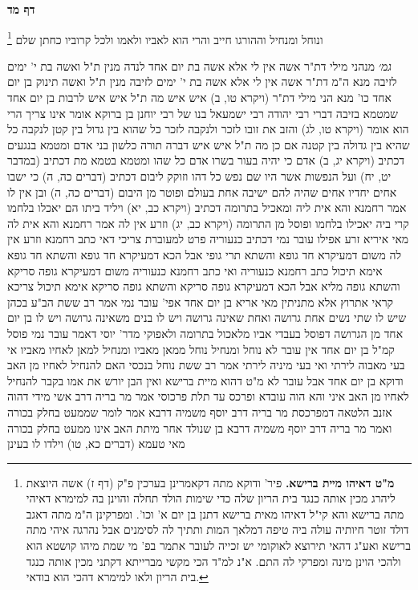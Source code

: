 \documentclass[12pt, openany]{book}
\newcommand{\sethebfont}{
\fontsize{10.5pt}{21.0pt} \selectfont
}
\newcommand{\twocol}[1]{
	{\sethebfont \begin{multicols}{2}
			#1
	\end{multicols}}	
}
\newcommand{\sectname}{}
\newcommand{\newsection}[1]{
	\addcontentsline{toc}{section}{#1}
	\renewcommand{\sectname}{#1}	
	\vspace{-\baselineskip}
	\begin{center}
		\textbf{%
\fontsize{16pt}{16pt}\selectfont
			#1}
	\end{center}
	\vspace{-\baselineskip}
	\nopagebreak
}
\newcommand{\footnotecomment}[1]{\footnote{#1}}
\newcommand{\commenta}[1]{\footnotecomment{#1}}
\begin{document}
\newsection{דף מד}
\twocol{ונוחל ומנחיל וההורגו חייב והרי הוא לאביו ולאמו ולכל קרוביו כחתן שלם 
\commenta{\textbf{מ"ט דאיהו מיית ברישא.}  פיר' ודוקא מתה דקאמרינן בערכין פ"ק (דף ז) אשה היוצאת ליהרג מכין אותה כנגד בית הריון שלה כדי שימות הולד תחלה והוינן בה למימרא דאיהי מתה ברישא והא קי"ל דאיהו מאית ברישא דתנן בן יום א' וכו'. ומפרקינן ה"מ מתה דאגב דולד זוטר חיותיה עולה ביה טיפה דמלאך המות ותתיך לה לסימנים אבל נהרגה איהי מתה ברישא ואע"ג דהאי תירוצא לאוקומי יש זכייה לעובר אתמר בפ' מי שמת מיהו קושטא הוא ולהכי הוינן מינה ומפרקי לה התם. א"נ למ"ד הכי מקשי מברייתא דקתני מכין אותה כנגד בית הריון ולאו למימרא דהכי הוא בודאי. }

{\large\emph{גמ׳}} מנהני מילי דת"ר  אשה אין לי אלא אשה בת יום אחד לנדה מנין  ת"ל ואשה
בת י' ימים לזיבה מנא ה"מ  דת"ר  אשה אין לי אלא אשה בת י' ימים לזיבה מנין  ת"ל ואשה
תינוק בן יום אחד כו' מנא הני מילי  דת"ר  (ויקרא טו, ב) איש איש  מה ת"ל איש איש  לרבות בן יום אחד שמטמא בזיבה דברי רבי יהודה 
רבי ישמעאל בנו של רבי יוחנן בן ברוקא אומר  אינו צריך הרי הוא אומר (ויקרא טו, לג) והזב את זובו לזכר ולנקבה  לזכר כל שהוא בין גדול בין קטן  לנקבה כל שהיא בין גדולה בין קטנה  אם כן מה ת"ל איש איש  דברה תורה כלשון בני אדם
ומטמא בנגעים דכתיב  (ויקרא יג, ב) אדם כי יהיה בעור בשרו אדם כל שהו
ומטמא בטמא מת דכתיב (במדבר יט, יח) ועל הנפשות אשר היו שם נפש כל דהו
וזוקק ליבום דכתיב (דברים כה, ה) כי ישבו אחים יחדיו אחים שהיה להם ישיבה אחת בעולם
ופוטר מן היבום (דברים כה, ה) ובן אין לו אמר רחמנא והא אית ליה
ומאכיל בתרומה דכתיב (ויקרא כב, יא) ויליד ביתו הם יאכלו בלחמו קרי ביה  יאכילו בלחמו
ופוסל מן התרומה (ויקרא כב, יג) וזרע אין לה אמר רחמנא והא אית לה 
מאי איריא זרע  אפילו עובר נמי דכתיב  כנעוריה פרט למעוברת 
צריכי דאי כתב רחמנא וזרע אין לה משום דמעיקרא חד גופא והשתא תרי גופי אבל הכא דמעיקרא חד גופא והשתא חד גופא אימא תיכול כתב רחמנא כנעוריה 
ואי כתב רחמנא כנעוריה משום דמעיקרא גופה סריקא והשתא גופה מליא אבל הכא דמעיקרא גופה סריקא והשתא גופה סריקא אימא תיכול צריכא 
קראי אתרוץ אלא מתניתין מאי אריא בן יום אחד אפי' עובר נמי  אמר רב ששת  הב"ע בכהן שיש לו שתי נשים אחת גרושה ואחת שאינה גרושה ויש לו בנים משאינה גרושה ויש לו בן יום אחד מן הגרושה
דפוסל בעבדי אביו מלאכול בתרומה  ולאפוקי מדר' יוסי דאמר עובר נמי פוסל קמ"ל  בן יום אחד אין עובר לא
נוחל ומנחיל נוחל ממאן  מאביו ומנחיל למאן  לאחיו מאביו אי בעי מאבוה לירתי ואי בעי מיניה לירתי 
אמר רב ששת  נוחל בנכסי האם להנחיל לאחיו מן האב  ודוקא בן יום אחד אבל עובר לא  מ"ט דהוא מיית ברישא ואין הבן יורש את אמו
בקבר להנחיל לאחיו מן האב 
איני והא הוה עובדא ופרכס עד תלת פרכוסי  אמר מר בריה דרב אשי  מידי דהוה אזנב הלטאה דמפרכסת 
מר בריה דרב יוסף משמיה דרבא אמר  לומר שממעט בחלק בכורה  ואמר מר בריה דרב יוסף משמיה דרבא  בן שנולד אחר מיתת האב אינו ממעט בחלק בכורה מאי טעמא (דברים כא, טו) וילדו לו בעינן 
}
\end{document}
